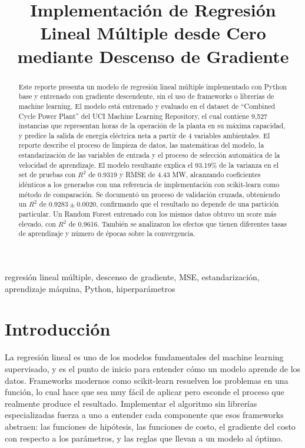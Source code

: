 \documentclass[conference]{IEEEtran}
\begin{document}
\title{Implementación de Regresión Lineal Múltiple desde Cero mediante Descenso de Gradiente}

\author{
}

\maketitle

\begin{abstract}
Este reporte presenta un modelo de regresión lineal múltiple implementado con Python base y entrenado con gradiente descendente, sin el uso de frameworks o librerías de machine learning. El modelo está entrenado y evaluado en el dataset de ``Combined Cycle Power Plant'' del UCI Machine Learning Repository, el cual contiene 9,527 instancias que representan horas de la operación de la planta en su máxima capacidad, y predice la salida de energía eléctrica neta a partir de 4 variables ambientales. El reporte describe el proceso de limpieza de datos, las matemáticas del modelo, la estandarización de las variables de entrada y el proceso de selección automática de la velocidad de aprendizaje. El modelo resultante explica el 93.19\% de la varianza en el set de pruebas con $R^2$ de 0.9319 y RMSE de 4.43 MW, alcanzando coeficientes idénticos a los generados con una referencia de implementación con scikit-learn como método de comparación. Se documentó un proceso de validación cruzada, obteniendo un $R^2$ de $0.9283 \pm 0.0020$, confirmando que el resultado no depende de una partición particular. Un Random Forest entrenado con los mismos datos obtuvo un score más elevado, con $R^2$ de 0.9616. También se analizaron los efectos que tienen diferentes tasas de aprendizaje y número de épocas sobre la convergencia.
\end{abstract}

\begin{IEEEkeywords}
regresión lineal múltiple, descenso de gradiente, MSE, estandarización, aprendizaje máquina, Python, hiperparámetros
\end{IEEEkeywords}

\section{Introducción}
\label{sec:intro}
La regresión lineal es uno de los modelos fundamentales del machine learning supervisado, y es el punto de inicio para entender cómo un modelo aprende de los datos. Frameworks modernos como scikit-learn resuelven los problemas en una función, lo cual hace que sea muy fácil de aplicar pero esconde el proceso que realmente produce el resultado. Implementar el algoritmo sin librerías especializadas fuerza a uno a entender cada componente que esos frameworks abstraen: las funciones de hipótesis, las funciones de costo, el gradiente del costo con respecto a los parámetros, y las reglas que llevan a un modelo al óptimo. 
\end{document}
